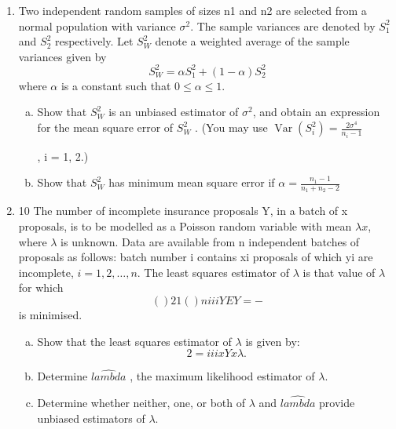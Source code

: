 \documentclass[a4paper,12pt]{article}
\begin{document}
\begin{enumerate}
\item Two independent random samples of sizes n1 and n2 are selected from a normal
population with variance $\sigma^2$. The sample variances are denoted by $S^2_1$ and $S^2_2$
respectively. Let $S^2_W$ denote a weighted average of the sample variances given by
\[ S^2_W = \alpha S^2_1 + (1 - \alpha)S^2_2\]
where $\alpha$ is a constant such that $0 \leq \alpha \leq 1$.
\begin{enumerate}[(a)]
\item Show that $S^2_W$
 is an unbiased estimator of $\sigma^2$, and obtain an expression for
the mean square error of $S^2_W$
 .
(You may use
${ \displaystyle \operatorname{Var}(S^2_i)  = \frac{2 \sigma^4}{n_i - 1} }$ 

, i = 1, 2.) 
\item Show that $S^2_W$
 has minimum mean square error if ${ \displaystyle  \alpha = \frac{n_1 - 1}{ n_1 + n_2 - 2} }$
\end{enumerate}

\item 10 The number of incomplete insurance proposals Y, in a batch of x proposals, is to
be modelled as a Poisson random variable with mean $\lambda x$, where $\lambda$ is unknown.
Data are available from n independent batches of proposals as follows: batch
number i contains xi proposals of which yi are incomplete, $i = 1,2, \ldots, n$.
The least squares estimator of $\lambda$ is that value of $\lambda$for which
\[( )2
1
( )
n
i i
i
Y EY
=
 −\]
is minimised.
\begin{enumerate}[(a)]
\item Show that the least squares estimator of $\lambda$ is given by:
\[2 = i i
i
x Y
x
\lambda
 .\] 
\item Determine $\hat{lambda}$ , the maximum likelihood estimator of $\lambda$. 
\item Determine whether neither, one, or both of $\lambda$ and $\hat{lambda}$ provide unbiased
estimators of $\lambda$. 
\end{enumerate}



\end{enumerate}
\end{document}
